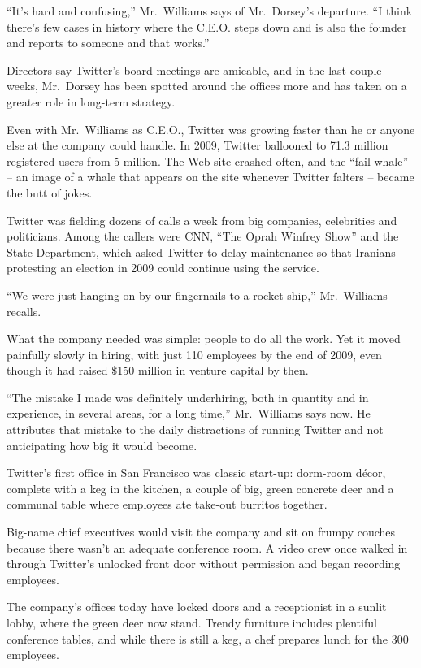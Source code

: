 ﻿\documentclass[12pt]{article}
\begin{document}
``It's hard and confusing,'' Mr.~Williams says of Mr.~Dorsey's departure. ``I think there's few
cases in history where the C.E.O. steps down and is also the founder and reports to someone and that
works.''

Directors say Twitter's board meetings are amicable, and in the last couple weeks, Mr.~Dorsey has
been spotted around the offices more and has taken on a greater role in long-term strategy.

Even with Mr.~Williams as C.E.O., Twitter was growing faster than he or anyone else at the company
could handle. In 2009, Twitter ballooned to 71.3 million registered users from 5 million. The Web
site crashed often, and the ``fail whale'' -- an image of a whale that appears on the site whenever
Twitter falters -- became the butt of jokes.

Twitter was fielding dozens of calls a week from big companies, celebrities and politicians. Among
the callers were CNN, ``The Oprah Winfrey Show'' and the State Department, which asked Twitter to
delay maintenance so that Iranians protesting an election in 2009 could continue using the service.

``We were just hanging on by our fingernails to a rocket ship,'' Mr.~Williams recalls.

What the company needed was simple: people to do all the work. Yet it moved painfully slowly in
hiring, with just 110 employees by the end of 2009, even though it had raised \$150 million in
venture capital by then.

``The mistake I made was definitely underhiring, both in quantity and in experience, in several
areas, for a long time,'' Mr.~Williams says now. He attributes that mistake to the daily
distractions of running Twitter and not anticipating how big it would become.

Twitter's first office in San Francisco was classic start-up: dorm-room d\'ecor, complete with a keg
in the kitchen, a couple of big, green concrete deer and a communal table where employees ate
take-out burritos together.

Big-name chief executives would visit the company and sit on frumpy couches because there wasn't an
adequate conference room. A video crew once walked in through Twitter's unlocked front door without
permission and began recording employees.

The company's offices today have locked doors and a receptionist in a sunlit lobby, where the green
deer now stand. Trendy furniture includes plentiful conference tables, and while there is still a
keg, a chef prepares lunch for the 300 employees.
\end{document}
